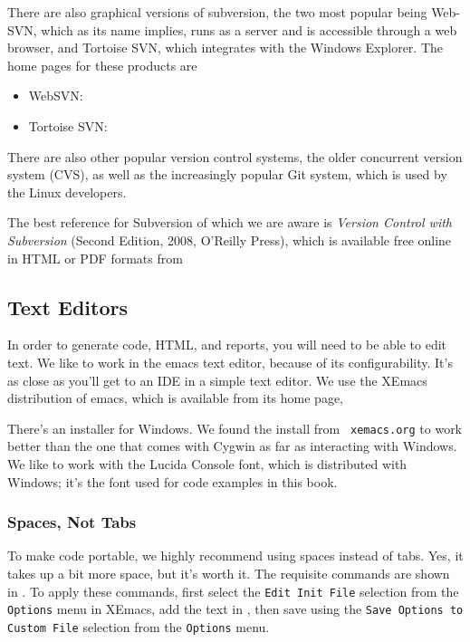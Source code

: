 There are also graphical versions of subversion, the two most popular
being Web-SVN, which as its name implies, runs as a server and is
accessible through a web browser, and Tortoise SVN, which integrates
with the Windows Explorer.  The home pages for these products are
%
\begin{itemize}
\item WebSVN: 
\item Tortoise SVN: 
\end{itemize}

There are also other popular version control systems, the older
concurrent version system (CVS), as well as the increasingly popular
Git system, which is used by the Linux developers.  

The best reference for Subversion of which we are aware is
{\it Version Control with Subversion} (Second Edition,
2008, O'Reilly Press), which is available free online in HTML or PDF
formats from
%
\begin{quote}
\end{quote}



\subsection{Text Editors}

In order to generate code, HTML, and reports, you will need to be able
to edit text.  We like to work in the emacs text editor, because of
its configurability.  It's as close as you'll get to an IDE in a
simple text editor.  We use the XEmacs distribution of emacs, which is
available from its home page,
%
\begin{quote}
\end{quote}
%
There's an installer for Windows.  We found the install from {\tt
xemacs.org} to work better than the one that comes with Cygwin as far
as interacting with Windows.  We like to work with the Lucida Console
font, which is distributed with Windows; it's the font used for code
examples in this book.

\subsubsection{Spaces, Not Tabs}

To make code portable, we highly recommend using spaces instead of
tabs.  Yes, it takes up a bit more space, but it's worth it.  The
requisite commands are shown in .  To apply these
commands, first select the {\tt Edit Init File} selection from the {\tt
Options} menu in XEmacs, add the text in , then
save using the {\tt Save Options to Custom File} selection from the
{\tt Options} menu.

